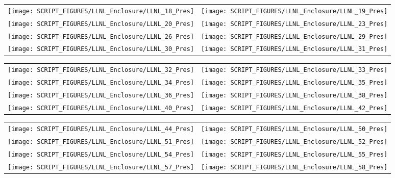 \begin{figure}[p]
\begin{tabular*}{\textwidth}{l@{\extracolsep{\fill}}r}
\texttt{[image: SCRIPT\_FIGURES/LLNL\_Enclosure/LLNL\_18\_Pres]} &
\texttt{[image: SCRIPT\_FIGURES/LLNL\_Enclosure/LLNL\_19\_Pres]} \\
\texttt{[image: SCRIPT\_FIGURES/LLNL\_Enclosure/LLNL\_20\_Pres]} &
\texttt{[image: SCRIPT\_FIGURES/LLNL\_Enclosure/LLNL\_23\_Pres]} \\
\texttt{[image: SCRIPT\_FIGURES/LLNL\_Enclosure/LLNL\_26\_Pres]} &
\texttt{[image: SCRIPT\_FIGURES/LLNL\_Enclosure/LLNL\_29\_Pres]} \\
\texttt{[image: SCRIPT\_FIGURES/LLNL\_Enclosure/LLNL\_30\_Pres]} &
\texttt{[image: SCRIPT\_FIGURES/LLNL\_Enclosure/LLNL\_31\_Pres]}
\end{tabular*}
\label{LLNL_Enclosure_Pres_3}
\end{figure}

\begin{figure}[p]
\begin{tabular*}{\textwidth}{l@{\extracolsep{\fill}}r}
\texttt{[image: SCRIPT\_FIGURES/LLNL\_Enclosure/LLNL\_32\_Pres]} &
\texttt{[image: SCRIPT\_FIGURES/LLNL\_Enclosure/LLNL\_33\_Pres]} \\
\texttt{[image: SCRIPT\_FIGURES/LLNL\_Enclosure/LLNL\_34\_Pres]} &
\texttt{[image: SCRIPT\_FIGURES/LLNL\_Enclosure/LLNL\_35\_Pres]} \\
\texttt{[image: SCRIPT\_FIGURES/LLNL\_Enclosure/LLNL\_36\_Pres]} &
\texttt{[image: SCRIPT\_FIGURES/LLNL\_Enclosure/LLNL\_38\_Pres]} \\
\texttt{[image: SCRIPT\_FIGURES/LLNL\_Enclosure/LLNL\_40\_Pres]} &
\texttt{[image: SCRIPT\_FIGURES/LLNL\_Enclosure/LLNL\_42\_Pres]}
\end{tabular*}
\label{LLNL_Enclosure_Pres_4}
\end{figure}

\begin{figure}[p]
\begin{tabular*}{\textwidth}{l@{\extracolsep{\fill}}r}
\texttt{[image: SCRIPT\_FIGURES/LLNL\_Enclosure/LLNL\_44\_Pres]} &
\texttt{[image: SCRIPT\_FIGURES/LLNL\_Enclosure/LLNL\_50\_Pres]} \\
\texttt{[image: SCRIPT\_FIGURES/LLNL\_Enclosure/LLNL\_51\_Pres]} &
\texttt{[image: SCRIPT\_FIGURES/LLNL\_Enclosure/LLNL\_52\_Pres]} \\
\texttt{[image: SCRIPT\_FIGURES/LLNL\_Enclosure/LLNL\_54\_Pres]} &
\texttt{[image: SCRIPT\_FIGURES/LLNL\_Enclosure/LLNL\_55\_Pres]} \\
\texttt{[image: SCRIPT\_FIGURES/LLNL\_Enclosure/LLNL\_57\_Pres]} &
\texttt{[image: SCRIPT\_FIGURES/LLNL\_Enclosure/LLNL\_58\_Pres]}
\end{tabular*}
\label{LLNL_Enclosure_Pres_5}
\end{figure}

